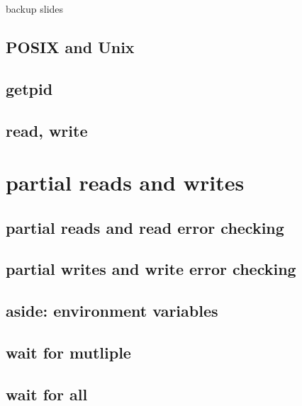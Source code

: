 \begin{frame}{backup slides}
\end{frame}

\subsection{POSIX and Unix}



\subsection{getpid}




\subsection{read, write}




\section{partial reads and writes}
\subsection{partial reads and read error checking}

\subsection{partial writes and write error checking}



\subsection{aside: environment variables}


\subsection{wait for mutliple}
 

\subsection{wait for all}


